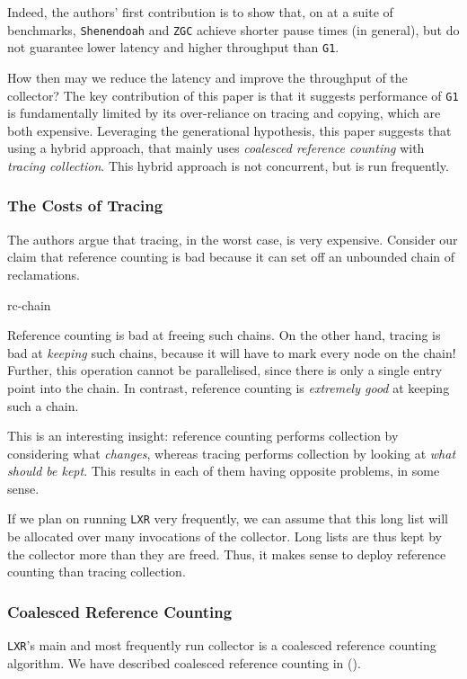 Indeed, the authors' first contribution is to show that, on at a suite of benchmarks, \texttt{Shenendoah} and \texttt{ZGC} achieve shorter pause times (in general), but do not guarantee lower latency and higher throughput than \texttt{G1}.

How then may we reduce the latency and improve the throughput of the collector? The key contribution of this paper is that it suggests performance of \texttt{G1} is fundamentally limited by its over-reliance on tracing and copying, which are both expensive. Leveraging the generational hypothesis, this paper suggests that using a hybrid approach, that mainly uses \textit{coalesced reference counting} with \textit{tracing collection}. This hybrid approach is not concurrent, but is run frequently.

\subsubsection{The Costs of Tracing}
The authors argue that tracing, in the worst case, is very expensive. Consider our claim that reference counting is bad because it can set off an unbounded chain of reclamations.

\begin{center}
    {rc-chain}
\end{center}

Reference counting is bad at freeing such chains. On the other hand, tracing is bad at \textit{keeping} such chains, because it will have to mark every node on the chain! Further, this operation cannot be parallelised, since there is only a single entry point into the chain. In contrast, reference counting is \textit{extremely good} at keeping such a chain.

This is an interesting insight: reference counting performs collection by considering what \textit{changes}, whereas tracing performs collection by looking at \textit{what should be kept}. This results in each of them having opposite problems, in some sense.

If we plan on running \texttt{LXR} very frequently, we can assume that this long list will be allocated over many invocations of the collector. Long lists are thus kept by the collector more than they are freed. Thus, it makes sense to deploy reference counting than tracing collection.

\subsubsection{Coalesced Reference Counting}
\texttt{LXR}'s main and most frequently run collector is a coalesced reference counting algorithm. We have described coalesced reference counting in  (). 

